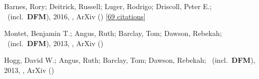 \item[{\color{numcolor}\scriptsize3}] Barnes, Rory; Deitrick, Russell; Luger, Rodrigo; Driscoll, Peter E.; \etal\ (incl.\ \textbf{DFM}), 2016, , ArXiv () [\href{https://ui.adsabs.harvard.edu/abs/2016arXiv160806919B}{69 citations}]

\item[{\color{numcolor}\scriptsize2}] Montet, Benjamin T.; Angus, Ruth; Barclay, Tom; Dawson, Rebekah; \etal\ (incl.\ \textbf{DFM}), 2013, , ArXiv ()

\item[{\color{numcolor}\scriptsize1}] Hogg, David W.; Angus, Ruth; Barclay, Tom; Dawson, Rebekah; \etal\ (incl.\ \textbf{DFM}), 2013, , ArXiv ()